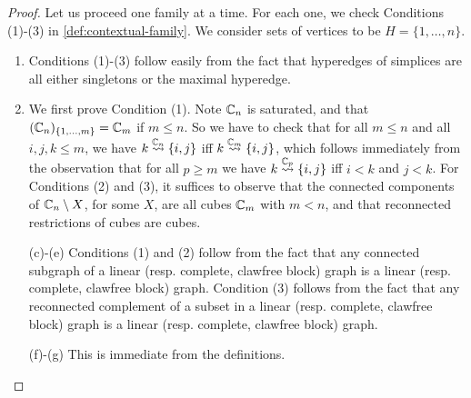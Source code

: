 \begin{proof}
  Let us proceed one family at a time.
  For each one, we check Conditions (1)-(3) in \cref{def:contextual-family}.
  We consider sets of vertices to be $H=\{1,\ldots,n\}$.
  \begin{enumerate}[label=(\alph*)]
    \item Conditions (1)-(3) follow easily from the fact that hyperedges of simplices are all either singletons or the maximal hyperedge.
    \item We first prove Condition (1). 
    Note ${\mathbb C}_n$ is saturated, and that $({\mathbb C}_n)_{\left\{1,\ldots,m\right\}}={\mathbb C}_m$ if $m\leq n$.
    So we have to check that for all $m\leq n$ and all $i,j,k\leq m$, we have $k\stackrel{{{\mathbb C}_n}}{\rightsquigarrow}\left\{i,j\right\}$ iff
    $k\stackrel{{{\mathbb C}_m}}{\rightsquigarrow}\left\{i,j\right\}$, which follows immediately from the observation that for all $p\geq m$ we have
    $k\stackrel{{{\mathbb C}_p}}{\rightsquigarrow}\left\{i,j\right\}$ iff $i<k$ and $j<k$.
    For Conditions (2) and (3), it suffices to observe that the connected components of ${\mathbb C}_n\setminus X$, for some $X$, are all cubes ${\mathbb C}_m$ with $m<n$, and that reconnected restrictions of cubes are cubes.
    \item[(c)-(e)] Conditions (1) and (2) follow from the fact that any connected subgraph of a linear (resp. complete, clawfree block) graph is a linear (resp. complete, clawfree block) graph. 
    Condition (3) follows from the fact that any reconnected complement of a subset in a linear (resp. complete, clawfree block) graph is a linear (resp. complete, clawfree block) graph.
    \item[(f)-(g)] This is immediate from the definitions.
  \end{enumerate}
\end{proof}

